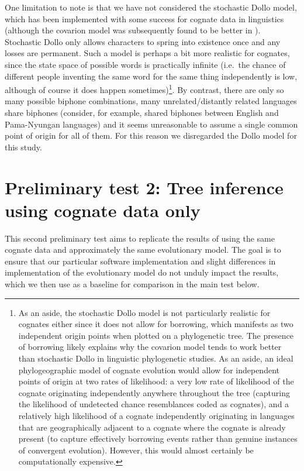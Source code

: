 One limitation to note is that we have not considered the stochastic Dollo model, which has been implemented with some success for cognate data in linguistics \autocite{bowern_computational_2012} (although the covarion model was subsequently found to be better in \textcite{bouckaert_origin_2018}). Stochastic Dollo only allows characters to spring into existence once and any losses are permanent. Such a model is perhaps a bit more realistic for cognates, since the state space of possible words is practically infinite (i.e.~the chance of different people inventing the same word for the same thing independently is low, although of course it does happen sometimes)\footnote{As an aside, the stochastic Dollo model is not particularly realistic for cognates either since it does not allow for borrowing, which manifests as two independent origin points when plotted on a phylogenetic tree. The presence of borrowing likely explains why the covarion model tends to work better than stochastic Dollo in linguistic phylogenetic studies. As an aside, an ideal phylogeographic model of cognate evolution would allow for independent points of origin at two rates of likelihood: a very low rate of likelihood of the cognate originating independently anywhere throughout the tree (capturing the likelihood of undetected chance resemblances coded as cognates), and a relatively high likelihood of a cognate independently originating in languages that are geographically adjacent to a cognate where the cognate is already present (to capture effectively borrowing events rather than genuine instances of convergent evolution). However, this would almost certainly be computationally expensive.}. By contrast, there are only so many possible biphone combinations, many unrelated/distantly related languages share biphones (consider, for example, shared biphones between English and Pama-Nyungan languages) and it seems unreasonable to assume a single common point of origin for all of them. For this reason we disregarded the Dollo model for this study.

\hypertarget{prelim-2}{%
\section{Preliminary test 2: Tree inference using cognate data only}\label{prelim-2}}

This second preliminary test aims to replicate the results of \textcite{bouckaert_origin_2018} using the same cognate data and approximately the same evolutionary model. The goal is to ensure that our particular software implementation and slight differences in implementation of the evolutionary model do not unduly impact the results, which we then use as a baseline for comparison in the main test below.


